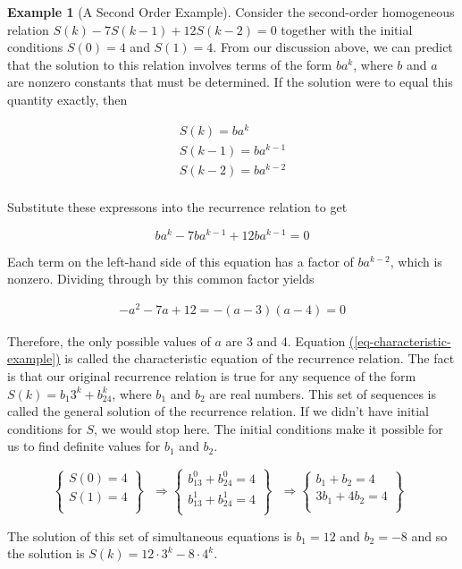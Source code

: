 \documentclass[10pt,]{book}
\theoremstyle{plain}
\theoremstyle{definition}
\theoremstyle{definition}
\theoremstyle{definition}
\newtheorem{example}[theorem]{Example}
\theoremstyle{definition}
\numberwithin{equation}{section}
\begin{document}
\begin{example}[A Second Order Example]\label{ex-second-order-rr}
 Consider the second-order homogeneous relation \(S(k) - 7S(k - 1) + 12 S(k- 2) = 0\) together with the initial conditions
\(S(0) = 4\) and \(S(1) = 4\). From our discussion above, we can predict that the solution to this relation involves terms of the form \(b a^k\),
where \(b\) and \(a\) are nonzero constants that must be determined. If the solution were to equal this quantity exactly, then

\[\quad \quad \quad  \begin{array}{ccc}
 S(k)=b a^k &   &   \\
 S(k-1)=b a^{k-1} & \textrm{   } & \textrm{  } \\
 S(k-2)=b a^{k-2} &   &   \\
\end{array}\]

Substitute these expressons into the recurrence relation to get


\[ b a^k-7 b a^{k-1}+12 b a^{k-1}=0\]

Each term on the left-hand side of this equation has a factor of \(b a^{k-2}\), which is nonzero. Dividing through by this common factor yields

\begin{gather}
-a^2 - 7a + 12 = -(a - 3) (a - 4) = 0\label{eq-characteristic-example}
\end{gather}%
\par
Therefore, the only possible values of \(a\) are 3 and 4. Equation \hyperref[eq-characteristic-example]{(\ref{eq-characteristic-example})} is called the characteristic equation of the recurrence relation.
The fact is that our original recurrence relation is true for any sequence of the form \(S(k) = b_1 3^k + b_24^k\), where \(b_1\) and \(b_2\) are
real numbers. This set of sequences is called the general solution of the recurrence relation. If we didn't have initial conditions for \(S\), we would stop here. The initial conditions make it possible for us to find definite values for \(b_1\) and \(b_2\).

 \[\left\{
\begin{array}{c}
 S(0)=4 \\
 S(1)=4 \\
\end{array}
\right\}\textrm{  }\Rightarrow \left\{
\begin{array}{c}
 b_13^0+b_24^0=4 \\
 b_13^1+b_24^1=4 \\
\end{array}
\right\}\textrm{  }\Rightarrow \left\{
\begin{array}{c}
 b_1+b_2=4 \\
 3b_1+4b_2=4 \\
\end{array}
\right\}\textrm{  }\]
%
\par
The solution of this set of simultaneous equations is \(b_1 = 12\) and \(b_2 = -8\) and so the solution is \(S(k) = 12 \cdot 3^k - 8 \cdot 4^k\).
%
\end{example}
\end{document}
